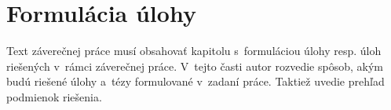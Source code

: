 
\chapter{Formulácia úlohy}

Text záverečnej práce musí obsahovať\/ kapitolu s~formuláciou úlohy resp. úloh riešených v~rámci záverečnej práce. V~tejto časti autor rozvedie spôsob, akým budú riešené úlohy a~tézy formulované v~zadaní práce. Taktiež uvedie prehľad podmienok riešenia.
